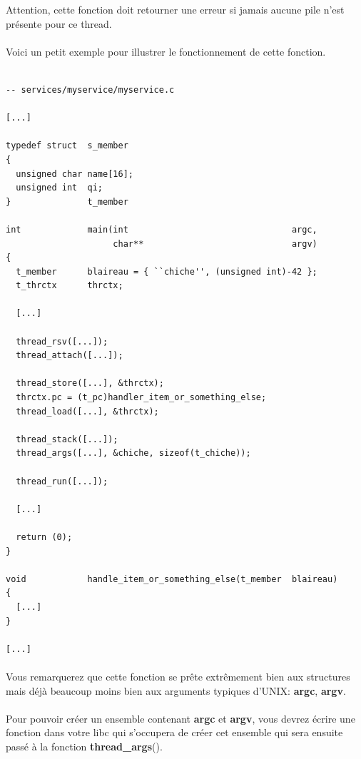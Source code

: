 \documentclass[10pt,a4wide]{article}
\begin{document}
Attention, cette fonction doit retourner une erreur si jamais aucune
pile n'est pr\'esente pour ce thread.

\paragraph{}

Voici un petit exemple pour illustrer le fonctionnement de cette fonction.

\begin{verbatim}

-- services/myservice/myservice.c

[...]

typedef struct  s_member
{
  unsigned char name[16];
  unsigned int  qi;
}               t_member

int             main(int                                argc,
                     char**                             argv)
{
  t_member      blaireau = { ``chiche'', (unsigned int)-42 };
  t_thrctx      thrctx;

  [...]

  thread_rsv([...]);
  thread_attach([...]);

  thread_store([...], &thrctx);
  thrctx.pc = (t_pc)handler_item_or_something_else;
  thread_load([...], &thrctx);

  thread_stack([...]);
  thread_args([...], &chiche, sizeof(t_chiche));

  thread_run([...]);

  [...]

  return (0);
}

void            handle_item_or_something_else(t_member  blaireau)
{
  [...]
}

[...]

\end{verbatim}

\paragraph{}

Vous remarquerez que cette fonction se pr\^ete extr\^emement bien aux
structures mais d\'ej\`a beaucoup moins bien aux arguments typiques d'UNIX:
\textbf{argc}, \textbf{argv}.

\paragraph{}

Pour pouvoir cr\'eer un ensemble contenant \textbf{argc} et \textbf{argv},
vous devrez \'ecrire une fonction dans votre libc qui s'occupera de
cr\'eer cet ensemble qui sera ensuite pass\'e \`a la fonction
\textbf{thread\_args}().
\end{document}
